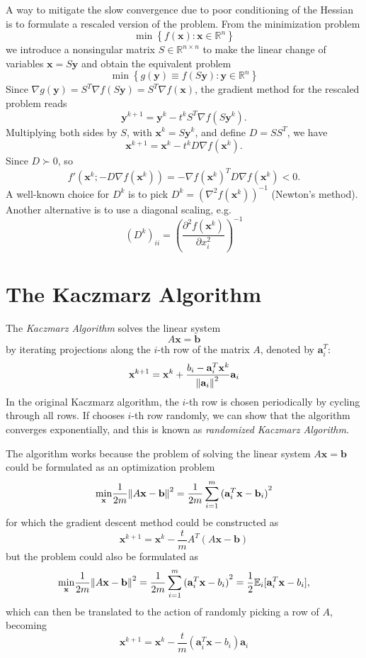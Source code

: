 \documentclass[12pt]{report}
\theoremstyle{definition}
\begin{document}
A way to mitigate the slow convergence due to poor conditioning of the Hessian
is to formulate a rescaled version of the problem. From the minimization problem
\[
    \min\left\{f(\mathbf{x}):\mathbf{x}\in\mathbb{R}^{n}\right\}
\]
we introduce a nonsingular matrix $S\in\mathbb{R}^{n\times n}$ to make the
linear change of variables $\mathbf{x}=S\mathbf{y}$ and obtain the equivalent
problem
\[
    \min\left\{g(\mathbf{y})\equiv f(S\mathbf{y}):\mathbf{y}\in\mathbb{R}^{n}\right\}
\]
Since $\nabla g(\mathbf{y})=S^T\nabla f(S\mathbf{y})=S^T\nabla f(\mathbf{x})$,
the gradient method for the rescaled problem reads
\[
    \mathbf{y}^{k+1}=\mathbf{y}^{k}-t^kS^T\nabla f(S\mathbf{y}^k).
\]
Multiplying both sides by $S$, with $\mathbf{x}^k=S\mathbf{y}^k$, and define
$D=SS^T$, we have
\[
    \mathbf{x}^{k+1}=\mathbf{x}^{k}-t^kD\nabla f(\mathbf{x}^k).
\]
Since $D\succ 0$, so
\[
    f'(\mathbf{x}^k;-D\nabla f(\mathbf{x}^k))=-\nabla f(\mathbf{x}^k)^TD\nabla
    f(\mathbf{x}^k)<0.
\]
A well-known choice for $D^k$ is to pick $D^k={(\nabla^2f(\mathbf{x}^k))}^{-1}$
(Newton's method). Another alternative is to use a diagonal scaling, e.g.
\[
    {\left(D^k\right)}_{ii}={\left(\frac{\partial^2f(\mathbf{x}^k)}{\partial
    x_i^2}\right)}^{-1}
\]

\section{The Kaczmarz Algorithm}

The \emph{Kaczmarz Algorithm} solves the linear system
\[
    A\mathbf{x}=\mathbf{b}
\]
by iterating projections along the $i$-th row of the matrix $A$, denoted by
$\mathbf{a}_i^T$:
\[
    \mathbf{x}^{k+1}=\mathbf{x}^k+\frac{b_i-\mathbf{a}_i^T\mathbf{x}^k}{\norm{\mathbf{a}_i}^2}\mathbf{a}_i
\]
In the original Kaczmarz algorithm, the $i$-th row is chosen periodically by
cycling through all rows. If chooses $i$-th row randomly, we can show that the
algorithm converges exponentially, and this is known as \emph{randomized Kaczmarz Algorithm}.

\medskip\noindent
The algorithm works because the problem of solving the linear system 
$A\mathbf{x}=\mathbf{b}$ could be formulated 
as an optimization problem
\[
    \underset{\mathbf{x}}{\text{min}}\frac{1}{2m}\norm{A\mathbf{x}-\mathbf{b}}^2
    =\frac{1}{2m}\sum_{i=1}^{m} {(\mathbf{a}_i^T\mathbf{x}-\mathbf{b}_i)}^{2}
\]
for which the gradient descent method could be constructed as
\[
    \mathbf{x}^{k+1}=\mathbf{x}^k-\frac{t}{m}A^T(A\mathbf{x}-\mathbf{b})
\]
but the problem could also be formulated as
\[
    \underset{\mathbf{x}}{\text{min}}\frac{1}{2m}\norm{A\mathbf{x}-\mathbf{b}}^2
    =\frac{1}{2m}\sum_{i=1}^{m} {(\mathbf{a}_i^T\mathbf{x}-b_i)}^{2}
    =\frac{1}{2}\mathbb{E}_i[\mathbf{a}_i^T\mathbf{x}-b_i],
\]
which can then be translated to the action of randomly picking a row of $A$,
becoming
\[
    \mathbf{x}^{k+1}=\mathbf{x}^k-\frac{t}{m}(\mathbf{a}_i^T\mathbf{x}-b_i)\mathbf{a}_i
\]
\end{document}
